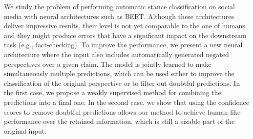 We study the problem of performing automatic stance classification on social media with neural architectures such as BERT. Although these architectures deliver impressive results, their level is not yet comparable to the one of humans and they might produce errors that have a significant impact on the downstream task (e.g., fact-checking). To improve the performance, we present a new neural architecture where the input also includes automatically generated negated perspectives over a given claim. The model is jointly learned to make simultaneously multiple predictions, which can be used either to improve the classification of the original perspective or to filter out doubtful predictions. In the first case, we propose a weakly supervised method for combining the predictions into a final one. In the second case, we show that using the confidence scores to remove doubtful predictions allows our method to achieve human-like performance over the retained information, which is still a sizable part of the original input.
